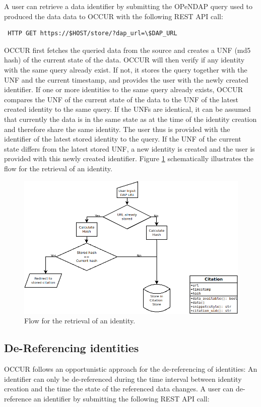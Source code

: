 \documentclass[letterpaper, twocolumn, parskip=half, fontsize=8pt, DIV=calc]{scrartcl}
\begin{document}
A user can retrieve a data identifier by submitting the \gls{OPeNDAP} query used to produced the data data to \gls{OCCUR} with the following \gls{REST} \gls{API} call:

\begin{lstlisting}
 HTTP GET https://$HOST/store/?dap_url=\$DAP_URL
\end{lstlisting}

OCCUR first fetches the queried data from the source and creates a \gls{UNF} (md5 hash) of the current state of the data. OCCUR will then verify if any identity with the same query already exist. If not, it stores the query together with the \gls{UNF} and the current timestamp, and provides the user with the newly created identifier. If one or more identities to the same query already exists, OCCUR compares the \gls{UNF} of the current state of the data to the \gls{UNF} of the latest created identity to the same query. If the \glspl{UNF} are identical, it can be assumed that currently the data is in the same state as at the time of the identity creation and therefore share the same identity. The user thus is provided with the identifier of the latest stored identity to the query. If the \gls{UNF} of the current state differs from the latest stored \gls{UNF}, a new identity is created and the user is provided with this newly created identifier. Figure \ref{fig_store} schematically illustrates the flow for the retrieval of an identity.

\begin{figure}[ht]
 \includegraphics[width=\columnwidth]{figures/store.png}
 \caption{Flow for the retrieval of an identity.}
 \label{fig_store}
\end{figure}

\subsection{De-Referencing identities}
\gls{OCCUR} follows an opportunistic approach for the de-referencing of identities: An identifier can only be de-referenced during the time interval between identity creation and the time the state of the referenced data changes. A user can de-reference an identifier by submitting the following \gls{REST} \gls{API} call:
\end{document}
